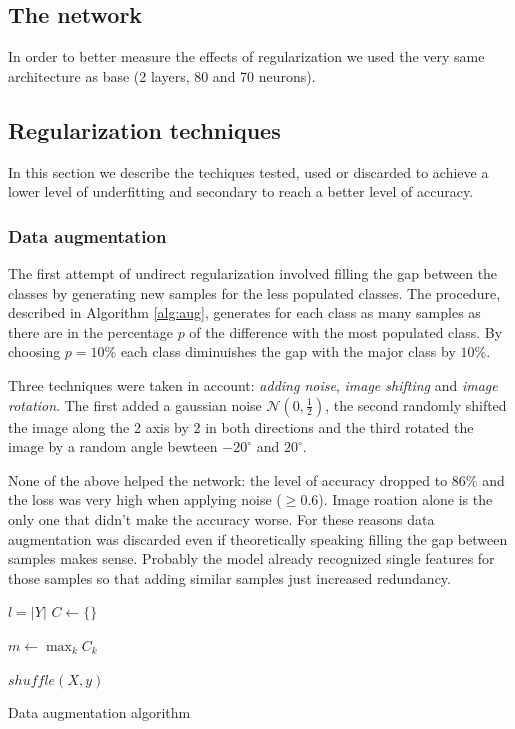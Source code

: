 \documentclass[compsoc]{IEEEtran}
\begin{document}
\subsection{The network}
In order to better measure the effects of regularization we used the very same architecture as base (2 layers, 80 and 70 neurons).


\subsection{Regularization techniques}
In this section we describe the techiques tested, used or discarded to achieve a lower level of underfitting and secondary to reach a better level of accuracy.

\subsubsection{Data augmentation}
The first attempt of undirect regularization involved filling the gap between the classes by generating new samples for the less populated classes. The procedure, described in Algorithm \ref{alg:aug}, generates for each class as many samples as there are in the percentage $p$ of the difference with the most populated class.
By choosing $p=10\%$ each class diminuishes the gap with the major class by $10\%$. \par
Three techniques were taken in account: \emph{adding noise}, \emph{image shifting} and \emph{image rotation}. The first added a gaussian noise $\mathcal{N}(0, \frac{1}{2})$, the second randomly shifted the image along the 2 axis by 2 in both directions and the third rotated the image by a random angle bewteen $-20^{\circ}$ and $20^{\circ}$. \par
None of the above helped the network: the level of accuracy dropped to $86\%$ and the loss was very high when applying noise ($\geq 0.6$). Image roation alone is the only one that didn't make the accuracy worse. For these reasons data augmentation was discarded even if theoretically speaking filling the gap between samples makes sense. Probably the model already recognized single features for those samples so that adding similar samples just increased redundancy.

\begin{algorithm}[h]
\SetAlgoLined
{}
$l=|Y|$\;
$C \gets \{\}$\;


$m \gets \max_k C_k$\;

\Return $shuffle(X, y)$\;

\caption{Data augmentation algorithm}\label{alg:aug}
\end{algorithm}
\end{document}
